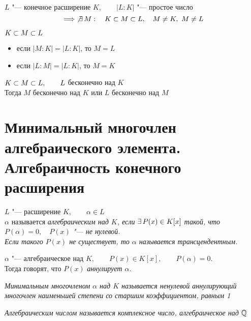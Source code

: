 \begin{implication}
	$ L $ "--- конечное расширение $ K, \qquad |L : K| $ "--- простое число
	$$ \implies \not\exists\, M : \quad K \subset M \subset L, \quad M \ne K, ~ M \ne L $$
\end{implication}

\begin{implication}
	$ K \subset M \subset L $

	\begin{itemize}
		\item если $ |M : K| = |L : K| $, то $ M = L $
		\item если $ |L : M| = |L : K| $, то $ M = K $
	\end{itemize}
\end{implication}

\begin{implication}
	$ K \subset M \subset L, \qquad L $ бесконечно над $ K $ \\
	Тогда $ M $ бесконечно над $ K $ или $ L $ бесконечно над $ M $
\end{implication}

\section{Минимальный многочлен алгебраического элемента. Алгебраичность конечного расширения}

\begin{definition}
	$ L $ "--- расширение $ K, \qquad \alpha \in L $ \\
	$ \alpha $ называется \it{алгебраическим} над $ K $, если $ \exists\, P(x) \in K[x] $ такой, что $ P(\alpha) = 0, \quad P(x) $ "--- не нулевой. \\
	Если такого $ P(x) $ не существует, то $ \alpha $ называется \it{трансцендентным}.
\end{definition}

\begin{definition}
	$ \alpha $ "--- алгебраическое над $ K, \qquad P(x) \in K[x], \qquad P(\alpha) = 0 $. \\
	Тогда говорят, что $ P(x) $ \it{аннулирует} $ \alpha $.

	\it{Минимальным многочленом} $ \alpha $ над $ K $ называется ненулевой аннулирующий многочлен наименьшей степени со старшим коэффициентом, равным 1
\end{definition}

\begin{definition}
	\it{Алгебраическим числом} называется комплексное число, алгебраическое над $ \mathbb{Q} $
\end{definition}

